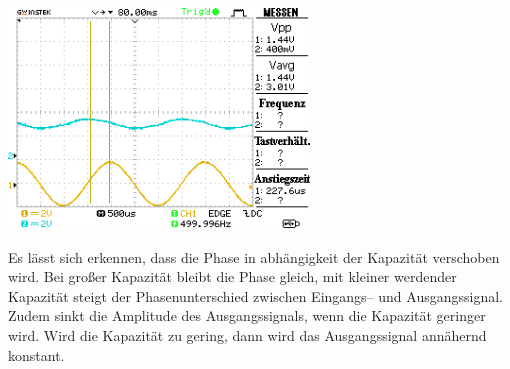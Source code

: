 \documentclass[10pt]{article}
\newenvironment{Figure}
  {\par\medskip\noindent\minipage{\linewidth}}
  {\endminipage\par\medskip}
\begin{document}
\begin{multicols}{2}
\begin{Figure}
        \end{Figure}
        \begin{Figure}
                \centering
                \includegraphics[width=0.6\textwidth]{data/DS0009.png}
        \end{Figure}
        Es lässt sich erkennen, dass die Phase in abhängigkeit der Kapazität verschoben wird.
        Bei großer Kapazität bleibt die Phase gleich, mit kleiner werdender Kapazität steigt der Phasenunterschied zwischen Eingangs-- und Ausgangssignal.
        Zudem sinkt die Amplitude des Ausgangssignals, wenn die Kapazität geringer wird.
        Wird die Kapazität zu gering, dann wird das Ausgangssignal annähernd konstant.


\end{multicols}
\end{document}
